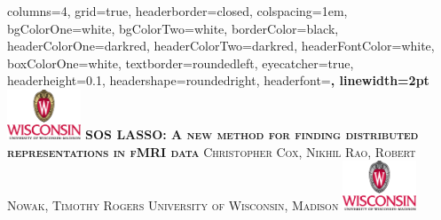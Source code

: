 \documentclass[landscape,a0paper,fontscale=0.3]{baposter}
\begin{document}
\begin{poster}
{
columns=4,
grid=true,
headerborder=closed, %
colspacing=1em, %
bgColorOne=white, %
bgColorTwo=white, %
borderColor=black, %
headerColorOne=darkred, %
headerColorTwo=darkred, %
headerFontColor=white, %
boxColorOne=white, %
textborder=roundedleft, %
eyecatcher=true, %
headerheight=0.1\textheight, %
headershape=roundedright, %
headerfont=\Large\bf, %
linewidth=2pt %
}
%
{\includegraphics[height=4em]{UWlogo_warm.eps}} %
{\bf\textsc{SOS LASSO: A new method for finding distributed representations in fMRI data}\vspace{0.5em}} %
{\textsc{Christopher Cox, Nikhil Rao, Robert Nowak, Timothy Rogers \hspace{12pt} University of Wisconsin, Madison}} %
{\includegraphics[height=4em]{UWlogo_cool.eps}} %



\end{poster}
\end{document}
